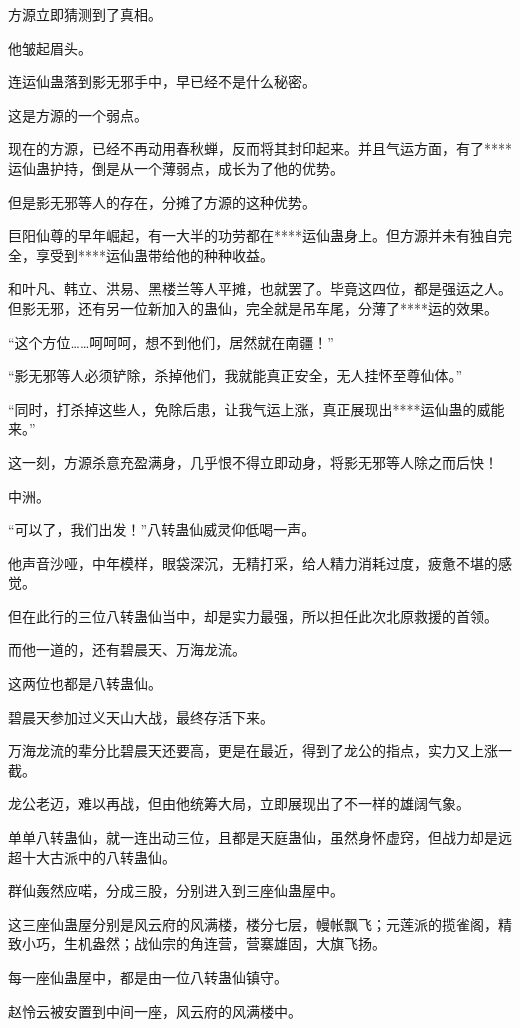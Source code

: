 \begin{this_body}
方源立即猜测到了真相。

他皱起眉头。

连运仙蛊落到影无邪手中，早已经不是什么秘密。

这是方源的一个弱点。

现在的方源，已经不再动用春秋蝉，反而将其封印起来。并且气运方面，有了****运仙蛊护持，倒是从一个薄弱点，成长为了他的优势。

但是影无邪等人的存在，分摊了方源的这种优势。

巨阳仙尊的早年崛起，有一大半的功劳都在****运仙蛊身上。但方源并未有独自完全，享受到****运仙蛊带给他的种种收益。

和叶凡、韩立、洪易、黑楼兰等人平摊，也就罢了。毕竟这四位，都是强运之人。但影无邪，还有另一位新加入的蛊仙，完全就是吊车尾，分薄了****运的效果。

“这个方位……呵呵呵，想不到他们，居然就在南疆！”

“影无邪等人必须铲除，杀掉他们，我就能真正安全，无人挂怀至尊仙体。”

“同时，打杀掉这些人，免除后患，让我气运上涨，真正展现出****运仙蛊的威能来。”

这一刻，方源杀意充盈满身，几乎恨不得立即动身，将影无邪等人除之而后快！

中洲。

“可以了，我们出发！”八转蛊仙威灵仰低喝一声。

他声音沙哑，中年模样，眼袋深沉，无精打采，给人精力消耗过度，疲惫不堪的感觉。

但在此行的三位八转蛊仙当中，却是实力最强，所以担任此次北原救援的首领。

而他一道的，还有碧晨天、万海龙流。

这两位也都是八转蛊仙。

碧晨天参加过义天山大战，最终存活下来。

万海龙流的辈分比碧晨天还要高，更是在最近，得到了龙公的指点，实力又上涨一截。

龙公老迈，难以再战，但由他统筹大局，立即展现出了不一样的雄阔气象。

单单八转蛊仙，就一连出动三位，且都是天庭蛊仙，虽然身怀虚窍，但战力却是远超十大古派中的八转蛊仙。

群仙轰然应喏，分成三股，分别进入到三座仙蛊屋中。

这三座仙蛊屋分别是风云府的风满楼，楼分七层，幔帐飘飞；元莲派的揽雀阁，精致小巧，生机盎然；战仙宗的角连营，营寨雄固，大旗飞扬。

每一座仙蛊屋中，都是由一位八转蛊仙镇守。

赵怜云被安置到中间一座，风云府的风满楼中。


\end{this_body}
